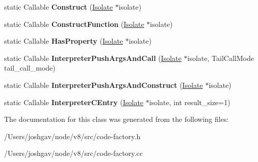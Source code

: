 \begin{DoxyCompactItemize}
\item 
static Callable {\bfseries Construct} (\hyperlink{classv8_1_1internal_1_1_isolate}{Isolate} $\ast$isolate)\hypertarget{classv8_1_1internal_1_1_code_factory_a352f558b2a2d180ca388632d97229784}{}\label{classv8_1_1internal_1_1_code_factory_a352f558b2a2d180ca388632d97229784}

\item 
static Callable {\bfseries Construct\+Function} (\hyperlink{classv8_1_1internal_1_1_isolate}{Isolate} $\ast$isolate)\hypertarget{classv8_1_1internal_1_1_code_factory_ae6f1885eebafba5f9756e42c5cbaec09}{}\label{classv8_1_1internal_1_1_code_factory_ae6f1885eebafba5f9756e42c5cbaec09}

\item 
static Callable {\bfseries Has\+Property} (\hyperlink{classv8_1_1internal_1_1_isolate}{Isolate} $\ast$isolate)\hypertarget{classv8_1_1internal_1_1_code_factory_a26729c3e80d2137653572f58fe9acdb3}{}\label{classv8_1_1internal_1_1_code_factory_a26729c3e80d2137653572f58fe9acdb3}

\item 
static Callable {\bfseries Interpreter\+Push\+Args\+And\+Call} (\hyperlink{classv8_1_1internal_1_1_isolate}{Isolate} $\ast$isolate, Tail\+Call\+Mode tail\+\_\+call\+\_\+mode)\hypertarget{classv8_1_1internal_1_1_code_factory_a88f9690e44f84be81d80a4be56d4c2c9}{}\label{classv8_1_1internal_1_1_code_factory_a88f9690e44f84be81d80a4be56d4c2c9}

\item 
static Callable {\bfseries Interpreter\+Push\+Args\+And\+Construct} (\hyperlink{classv8_1_1internal_1_1_isolate}{Isolate} $\ast$isolate)\hypertarget{classv8_1_1internal_1_1_code_factory_a6940081f6e47230e3b6a707e64bc710c}{}\label{classv8_1_1internal_1_1_code_factory_a6940081f6e47230e3b6a707e64bc710c}

\item 
static Callable {\bfseries Interpreter\+C\+Entry} (\hyperlink{classv8_1_1internal_1_1_isolate}{Isolate} $\ast$isolate, int result\+\_\+size=1)\hypertarget{classv8_1_1internal_1_1_code_factory_a9d19422679fa2875fa82f2c8725beefe}{}\label{classv8_1_1internal_1_1_code_factory_a9d19422679fa2875fa82f2c8725beefe}

\end{DoxyCompactItemize}


The documentation for this class was generated from the following files\+:\begin{DoxyCompactItemize}
\item 
/\+Users/joshgav/node/v8/src/code-\/factory.\+h\item 
/\+Users/joshgav/node/v8/src/code-\/factory.\+cc\end{DoxyCompactItemize}
